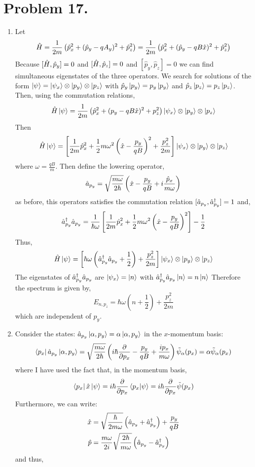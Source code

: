 \documentclass[12pt]{extarticle}
\begin{document}
\section*{Problem 17.}

\begin{enumerate}
\item Let \[\hat{H} = \frac{1}{2m} \left(\hat{p}_x^2 + (\hat{p}_y - q A_y)^2 + \hat{p}_z^2 \right) = \frac{1}{2m} \left(\hat{p}_x^2 + (\hat{p}_y - q B \hat{x})^2 + \hat{p}_z^2 \right) \]
Because $[\hat{H}, \hat{p}_y] = 0$ and $[\hat{H}, \hat{p}_z] = 0$ and $[\hat{p}_y, \hat{p}_z] = 0$ we can find simultaneous eigenstates of the three operators. We search for solutions of the form $\left| \psi \right> = \left| \psi_x \right> \otimes \left| p_y \right> \otimes \left| p_z \right>$ with $\hat{p}_y \left| p_y \right> = p_y \left| p_y \right>$ and $\hat{p}_z \left| p_z \right> = p_z \left| p_z \right>$. Then, using the commutation relations, \[ \hat{H} \left| \psi \right> = \frac{1}{2m} \left(\hat{p}_x^2 + (p_y - q B \hat{x})^2 + p_z^2 \right) \left| \psi_x \right> \otimes \left| p_y \right> \otimes \left| p_z \right>  \]  
Then 
\[ \hat{H} \left| \psi \right> = \left[ \frac{1}{2m} \hat{p}_x^2 + \frac{1}{2} m \omega^2 \left(\hat{x} - \frac{p_y}{q B} \right)^2 + \frac{p_z^2}{2m} \right] \left| \psi_x \right> \otimes \left| p_y \right> \otimes \left| p_z \right>  \] 
where $\omega = \frac{qB}{m}$. Then define the lowering operator,
\[\hat{a}_{p_y} = \sqrt{\frac{m \omega}{2 \hbar}} \left(\hat{x} - \frac{p_y}{q B} + i \frac{\hat{p}_x}{m \omega} \right) \]
as before, this operators satisfies the commutation relation $[\hat{a}_{p_y}, \hat{a}^\dagger_{p_y}] = 1$ and,
\[ \hat{a}^\dagger_{p_y} \hat{a}_{p_y} = \frac{1}{\hbar \omega} \left[ \frac{1}{2m} \hat{p}_x^2 + \frac{1}{2} m \omega^2 \left(\hat{x} - \frac{p_y}{q B} \right)^2 \right] - \frac{1}{2}\]   
Thus, 
\[ \hat{H} \left| \psi \right> = \left[ \hbar \omega \left(\hat{a}^\dagger_{p_y} \hat{a}_{p_y} + \frac{1}{2} \right) + \frac{p_z^2}{2m} \right] \left| \psi_x \right> \otimes \left| p_y \right> \otimes \left| p_z \right>  \]
The eigenstates of $\hat{a}^\dagger_{p_y} \hat{a}_{p_y}$ are $\left| \psi_x \right> = \left| n \right>$ with $\hat{a}^\dagger_{p_y} \hat{a}_{p_y} \left| n \right> = n \left| n \right>$ Therefore the spectrum is given by, 
\[E_{n, p_z} = \hbar \omega \left(n + \frac{1}{2} \right) + \frac{p_z^2 }{2m}\]
which are independent of $p_y$. 

\item
Consider the states: $\hat{a}_{p_y} \left| \alpha, p_y \right> = \alpha \left| \alpha, p_y \right>$ in the $x$-momentum basis:
\[ \left< p_x \right| \hat{a}_{p_y} \left| \alpha, p_y \right> = \sqrt{\frac{m \omega}{2 \hbar}} \left( i \hbar \frac{\partial{}}{\partial{p_x}} - \frac{p_y}{q B} + \frac{i p_x}{m \omega} \right) \tilde{\psi}_\alpha(p_x) = \alpha \tilde{\psi}_\alpha(p_x)\]
where I have used the fact that, in the momentum basis,
\[\left< p_x \right| \hat{x} \left| \psi \right> = i \hbar \frac{\partial{}}{\partial{p_x}} \left< p_x | \psi \right> = i \hbar \frac{\partial{}}{\partial{p_x}} \tilde{\psi}(p_x)\]
Furthermore, we can write:
\begin{align*}
\hat{x} &= \sqrt{\frac{\hbar}{2m \omega}} \left(\hat{a}_{p_y} + \hat{a}^\dagger_{p_y} \right) + \frac{p_y}{q B}  \\ 
\hat{p} &= \frac{m \omega}{2i} \sqrt{\frac{2\hbar}{m \omega}} \left(\hat{a}_{p_y} - \hat{a}^\dagger_{p_y}\right)
\end{align*}
and thus,


\end{enumerate}
\end{document}
